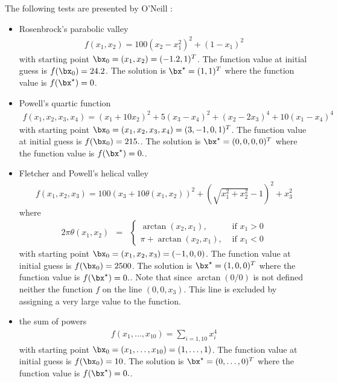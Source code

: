 The following tests are presented by O'Neill :
\begin{itemize}
\item Rosenbrock's parabolic valley \cite{citeulike:1903787}
\begin{eqnarray}
\label{nm-oneill-rosenbrock}
f(x_1,x_2) = 100(x_2 - x_1^2)^2 + (1-x_1)^2
\end{eqnarray}
with starting point $\bx_0=(x_1,x_2) = (-1.2,1)^T$. The function value at initial guess
is $f(\bx_0)=24.2$. The solution is $\bx^\star=(1,1)^T$ where the function 
value is $f(\bx^\star)=0$.
\item Powell's quartic function \cite{Powell08011962}
\begin{eqnarray}
\label{nm-oneill-powell}
f(x_1,x_2,x_3,x_4) = (x_1 + 10x_2)^2 + 5 ( x_3 - x_4)^2 + (x_2 - 2x_3)^4 + 10 (x_1 - x_4)^4
\end{eqnarray}
with starting point $\bx_0=(x_1,x_2,x_3,x_4) = (3,-1,0,1)^T$. The function value at initial guess
is $f(\bx_0)=215.$. The solution is $\bx^\star=(0,0,0,0)^T$ where the function 
value is $f(\bx^\star)=0.$.
\item Fletcher and Powell's helical valley \cite{R.Fletcher08011963}
\begin{eqnarray}
\label{nm-oneill-fletcherpowell}
f(x_1,x_2,x_3) = 100\left(x_3 + 10\theta(x_1,x_2)\right)^2 
+ \left(\sqrt{x_1^2 + x_2^2} - 1\right)^2  + x_3^2
\end{eqnarray}
where 
\begin{eqnarray}
\label{nm-oneill-fletcherpowelltheta}
2\pi \theta(x_1,x_2) &=& 
\left\{
\begin{array}{ll} 
\arctan(x_2,x_1), & \textrm{ if } x_1>0\\
\pi + \arctan(x_2,x_1), & \textrm{ if } x_1<0
\end{array}
\right.
\end{eqnarray}
with starting point $\bx_0 = (x_1,x_2,x_3) = (-1,0,0)$. The function value at initial guess
is $f(\bx_0)=2500$. The solution is $\bx^\star=(1,0,0)^T$ where the function 
value is $f(\bx^\star)=0.$. Note
that since $\arctan(0/0)$ is not defined neither 
the function $f$ on the line $(0,0,x_3)$. This line is excluded 
by assigning a very large value to the function.
\item the sum of powers 
\begin{eqnarray}
\label{nm-oneill-powers}
f(x_1,\ldots,x_{10}) = \sum_{i=1,10} x_i^4
\end{eqnarray}
with starting point $\bx_0 = (x_1,\ldots,x_{10}) = (1,\ldots,1)$. The function value at initial guess
is $f(\bx_0)=10$. The solution is $\bx^\star=(0,\ldots,0)^T$ where the function 
value is $f(\bx^\star)=0.$. 
\end{itemize}

